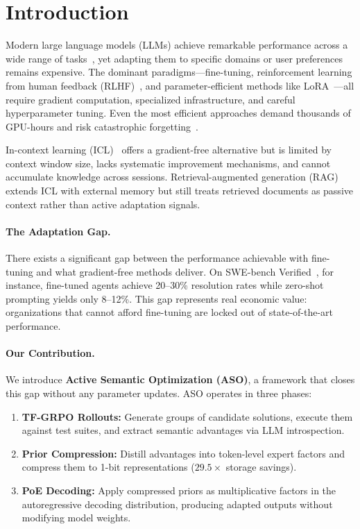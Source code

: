 \section{Introduction}

\label{sec:intro}

Modern large language models (LLMs) achieve remarkable performance across a wide
range of tasks~\cite{brown2020language, openai2023gpt4, anthropic2024claude},
yet adapting them to specific domains or user preferences remains expensive. The
dominant paradigms---fine-tuning, reinforcement learning from human feedback
(RLHF)~\cite{ouyang2022training}, and parameter-efficient methods like
LoRA~\cite{hu2022lora}---all require gradient computation, specialized
infrastructure, and careful hyperparameter tuning. Even the most efficient
approaches demand thousands of GPU-hours and risk catastrophic
forgetting~\cite{kirkpatrick2017overcoming}.

In-context learning (ICL)~\cite{brown2020language} offers a gradient-free
alternative but is limited by context window size, lacks systematic improvement
mechanisms, and cannot accumulate knowledge across sessions. Retrieval-augmented
generation (RAG)~\cite{lewis2020retrieval} extends ICL with external memory but
still treats retrieved documents as passive context rather than active adaptation
signals.

\paragraph{The Adaptation Gap.}
There exists a significant gap between the performance achievable with
fine-tuning and what gradient-free methods deliver. On SWE-bench
Verified~\cite{jimenez2024swebench}, for instance, fine-tuned agents achieve
20--30\% resolution rates while zero-shot prompting yields only 8--12\%. This
gap represents real economic value: organizations that cannot afford fine-tuning
are locked out of state-of-the-art performance.

\paragraph{Our Contribution.}
We introduce \textbf{Active Semantic Optimization (ASO)}, a framework that
closes this gap without any parameter updates. ASO operates in three phases:

\begin{enumerate}[leftmargin=1.5em]
    \item \textbf{TF-GRPO Rollouts:} Generate groups of candidate solutions,
          execute them against test suites, and extract semantic advantages via
          LLM introspection.
    \item \textbf{Prior Compression:} Distill advantages into token-level expert
          factors and compress them to 1-bit representations ($29.5\times$
          storage savings).
    \item \textbf{PoE Decoding:} Apply compressed priors as multiplicative
          factors in the autoregressive decoding distribution, producing adapted
          outputs without modifying model weights.
\end{enumerate}


